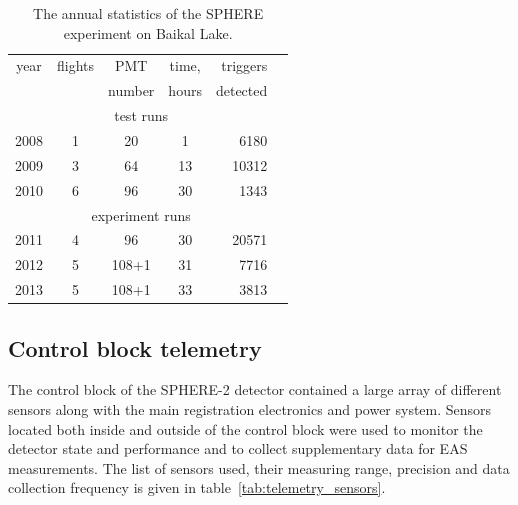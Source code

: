 \documentclass[final,5p,times,twocolumn]{elsarticle}
\begin{document}
\begin{table}[tb]
\centering
\caption{The annual statistics of the SPHERE experiment on Baikal Lake.
}
\label{tab:statistics}
\vspace{1pc}
\begin{tabular}{|c||c|c|c|r|r|}
\hline
year  & flights & PMT    & time, & triggers \\ 
      &         & number & hours & detected \\ 
\hline \hline
\multicolumn{5}{|c|}{test runs} \\
\hline
2008 & 1 &  20 &  1 &  6180 \\ 
2009 & 3 &  64 & 13 & 10312 \\ 
2010 & 6 &  96 & 30 &  1343 \\
\hline
\multicolumn{5}{|c|}{experiment runs} \\
\hline
2011 & 4 &  96 & 30 & 20571 \\
2012 & 5 & 108+1 & 31 &  7716 \\
2013 & 5 & 108+1 & 33 &  3813 \\
\hline
\end{tabular}
\end{table}

\subsection{Control block telemetry}

The control block of the SPHERE-2 detector contained a large array of different sensors along with the main registration electronics and power system. Sensors located both inside and outside of the control block were used to monitor the detector state and performance and to collect supplementary data for EAS measurements. The list of sensors used, their measuring range, precision and data collection frequency is given in table~\ref{tab:telemetry_sensors}. 
\end{document}
